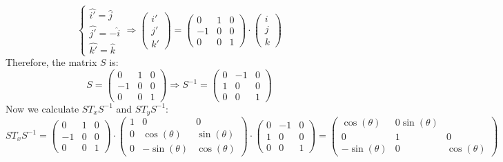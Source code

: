 \documentclass{article}
\begin{document}
\begin{equation*}
    \begin{cases}
        \hat{i'} = \hat{j} \\
        \hat{j'} = -\hat{i} \\
        \hat{k'} = \hat{k}   
    \end{cases}
    \Rightarrow
    \begin{pmatrix}
        i' \\
        j' \\
        k'
    \end{pmatrix}
    =
    \begin{pmatrix}
        0 & 1 & 0 \\
        -1 & 0 & 0 \\
        0 & 0 & 1
    \end{pmatrix}
    \cdot
    \begin{pmatrix}
        i \\
        j \\
        k
    \end{pmatrix}
\end{equation*}
Therefore, the matrix \(S\) is:
\begin{equation*}
    S = 
    \begin{pmatrix}
        0 & 1 & 0 \\
        -1 & 0 & 0 \\
        0 & 0 & 1
    \end{pmatrix}
    \Rightarrow
    S^{-1} =
    \begin{pmatrix}
        0 & -1 & 0 \\
        1 & 0 & 0 \\
        0 & 0 & 1
    \end{pmatrix}
\end{equation*}
Now we calculate \(ST_x S^{-1}\) and \(ST_y S^{-1}\):
\begin{equation*}
    ST_x S^{-1} = 
    \begin{pmatrix}
        0 & 1 & 0 \\
        -1 & 0 & 0 \\
        0 & 0 & 1
    \end{pmatrix}
    \cdot
    \begin{pmatrix}
        1 & 0 & 0 \\
        0 & \cos(\theta) & \sin(\theta) \\
        0 & -\sin(\theta) & \cos(\theta)
    \end{pmatrix}
    \cdot
    \begin{pmatrix}
        0 & -1 & 0 \\
        1 & 0 & 0 \\
        0 & 0 & 1
    \end{pmatrix}
    =
    \begin{pmatrix}
        \cos(\theta) & 0 \sin(\theta) \\
        0 & 1 & 0 \\   
        -\sin(\theta) & 0 & \cos(\theta)
    \end{pmatrix}
\end{equation*}
\end{document}
